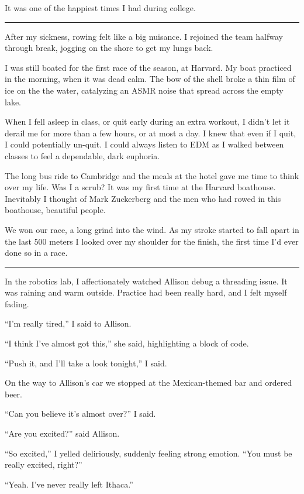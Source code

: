 It was one of the happiest times I had during college.

\plainfancybreak{12pt}{2}{* * *}

After my sickness, rowing felt like a big nuisance.  I rejoined the team halfway
through break, jogging on the shore to get my lungs back.  

I was still boated for the first race of the season, at Harvard.  My boat
practiced in the morning, when it was dead calm.  The bow of the shell broke a
thin film of ice on the the water, catalyzing an ASMR noise that spread across
the empty lake.   

When I fell asleep in class, or quit early during an extra workout, I didn't let
it derail me for more than a few hours, or at most a day.  I knew that even if I
quit, I could potentially un-quit.  I could always listen to EDM as I walked
between classes to feel a dependable, dark euphoria.
 
The long bus ride to Cambridge and the meals at the hotel gave me time to think
over my life.  Was I a scrub?  It was my first time at the Harvard boathouse.
Inevitably I thought of Mark Zuckerberg and the men who had rowed in this
boathouse, beautiful people. 

We won our race, a long grind into the wind. As my stroke started to fall apart
in the last 500 meters I looked over my shoulder for the finish, the first time
I'd ever done so in a race.

\plainfancybreak{12pt}{2}{* * *}

In the robotics lab, I affectionately watched Allison debug a threading issue.
It was raining and warm outside.  Practice had been really hard, and I felt
myself fading.

``I'm really tired,'' I said to Allison.

``I think I've almost got this,'' she said, highlighting a block of code.

``Push it, and I'll take a look tonight,'' I said.

On the way to Allison's car we stopped at the Mexican-themed bar and ordered
beer.

``Can you believe it's almost over?'' I said.

``Are you excited?'' said Allison.

``So excited,'' I yelled deliriously, suddenly feeling strong emotion.  ``You
must be really excited, right?''

``Yeah.  I've never really left Ithaca.''

